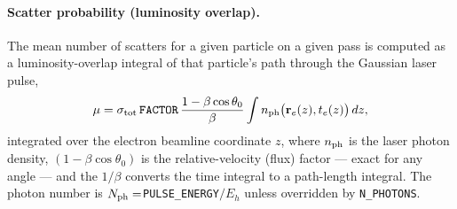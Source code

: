\paragraph{Scatter probability (luminosity overlap).}
The mean number of scatters for a given particle on a given pass is computed as a
luminosity-overlap integral of that particle's path through the Gaussian laser
pulse,
\begin{equation}
\mu = \sigma_{\rm tot}\,\text{\tt FACTOR}\,\frac{1-\beta\cos\theta_0}{\beta}
      \int n_{\rm ph}\big(\mathbf{r}_e(z),t_e(z)\big)\,dz,
\end{equation}
integrated over the electron beamline coordinate $z$, where $n_{\rm ph}$ is the
laser photon density, $(1-\beta\cos\theta_0)$ is the relative-velocity (flux)
factor --- exact for any angle --- and the $1/\beta$ converts the time integral to
a path-length integral.  The photon number is $N_{\rm ph}=$\verb|PULSE_ENERGY|$/E_h$
unless overridden by \verb|N_PHOTONS|.

